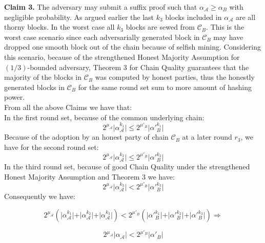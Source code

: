 \textbf{Claim 3.} The adversary may submit a suffix proof such that $\alpha_\mathcal{A} \geq \alpha_B$
with negligible probability.
As argued earlier the last $k_3$ blocks included in $\alpha_\mathcal{A}$ are all thorny blocks. In the worst case  all $k_3 $ blocks
are sewed from $\mathcal{C}_B$. This is the worst case scenario since each adversarially
generated block in $\mathcal{C}_B$ may have dropped one smooth block out of the chain
because of selfish mining. Considering this scenario, because of the strengthened
Honest Majority Assumption for $(1/3)$-bounded adversary, Theorem 3 for Chain
Quality guarantees that the majority of the blocks in $\mathcal{C}_B$ was computed by
honest parties, thus the honestly generated blocks in $\mathcal{C}_B$ for the same round
set sum to more amount of hashing power.\\
From all the above Claims we have that:\\
In the first round set, because of the common underlying chain:
\begin{equation} \label{eq_v_round_set_1}
2^{\mu_\mathcal{A}} \vert \alpha_\mathcal{A}^{k_1} \vert \leq 2^{\mu'_B} \vert \alpha'{_B^{k_1}} \vert
\end{equation}
Because of the adoption by an honest party of chain $\mathcal{C}_B$ at a later round $r_3$, we
have for the second round set:
\begin{equation} \label{eq_v_round_set_2}
2^{\mu_\mathcal{A}} \vert \alpha_\mathcal{A}^{k_2} \vert \leq 2^{\mu'_B} \vert \alpha'{_B^{k_2}} \vert
\end{equation}
In the third round set, because of good Chain Quality under the strengthened Honest
Majority Assumption and Theorem 3 we have:
\begin{equation} \label{eq_v_round_set_3}
2^{\mu_\mathcal{A}} \vert \alpha_\mathcal{A}^{k_3} \vert < 2^{\mu'_B} \vert \alpha'{_B^{k_3}} \vert
\end{equation}
Consequently we have:

\begin{equation*}
2^{\mu_\mathcal{A}} ( \vert \alpha_\mathcal{A}^{k_1} \vert + \vert \alpha_\mathcal{A}^{k_2} \vert + \vert
\alpha_\mathcal{A}^{k_3} \vert ) < 2^{\mu'_B} ( \vert \alpha'{_B^{k_1}} \vert + \vert
\alpha'{_B^{k_2}} \vert + \vert \alpha'{_B^{k_3}} \vert) \Rightarrow
\end{equation*}

\begin{equation} \label{eq_v_all_round_sets}
2^{\mu_\mathcal{A}} \vert \alpha_\mathcal{A} \vert < 2^{\mu'_B} \vert \alpha'{_B} \vert
\end{equation}

